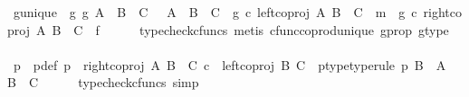\begin{isabellebody}
\ g{\isacharunderscore}{\kern0pt}unique{\isacharcolon}{\kern0pt}\ {\isachardoublequoteopen}{\isasymexists}{\isacharbang}{\kern0pt}\ g{\isachardot}{\kern0pt}\ {\isacharparenleft}{\kern0pt}{\isacharparenleft}{\kern0pt}g{\isacharcolon}{\kern0pt}\ A\ {\isasymCoprod}\ {\isacharparenleft}{\kern0pt}B\ {\isasymCoprod}\ C{\isacharparenright}{\kern0pt}\ \ {\isasymrightarrow}\ {\isacharparenleft}{\kern0pt}A\ {\isasymCoprod}\ B{\isacharparenright}{\kern0pt}\ {\isasymCoprod}\ C{\isacharparenright}{\kern0pt}\ {\isasymand}\ {\isacharparenleft}{\kern0pt}g\ {\isasymcirc}\isactrlsub c\ {\isacharparenleft}{\kern0pt}left{\isacharunderscore}{\kern0pt}coproj\ A\ {\isacharparenleft}{\kern0pt}B\ {\isasymCoprod}\ C{\isacharparenright}{\kern0pt}{\isacharparenright}{\kern0pt}\ {\isacharequal}{\kern0pt}\ m{\isacharparenright}{\kern0pt}\ {\isasymand}\ {\isacharparenleft}{\kern0pt}g\ {\isasymcirc}\isactrlsub c\ {\isacharparenleft}{\kern0pt}right{\isacharunderscore}{\kern0pt}coproj\ A\ {\isacharparenleft}{\kern0pt}B\ {\isasymCoprod}\ C{\isacharparenright}{\kern0pt}{\isacharparenright}{\kern0pt}\ {\isacharequal}{\kern0pt}\ f{\isacharparenright}{\kern0pt}{\isacharparenright}{\kern0pt}{\isachardoublequoteclose}\isanewline
\ \ \ \ \isamarkupfalse%
\ {\isacharparenleft}{\kern0pt}typecheck{\isacharunderscore}{\kern0pt}cfuncs{\isacharcomma}{\kern0pt}\ metis\ cfunc{\isacharunderscore}{\kern0pt}coprod{\isacharunderscore}{\kern0pt}unique\ g{\isacharunderscore}{\kern0pt}prop\ g{\isacharunderscore}{\kern0pt}type{\isacharparenright}{\kern0pt}\isanewline
\isanewline
\ \ \isamarkupfalse%
\ p\ \ p{\isacharunderscore}{\kern0pt}def{\isacharcolon}{\kern0pt}\ {\isachardoublequoteopen}p\ {\isacharequal}{\kern0pt}\ {\isacharparenleft}{\kern0pt}right{\isacharunderscore}{\kern0pt}coproj\ A\ {\isacharparenleft}{\kern0pt}B\ {\isasymCoprod}\ C{\isacharparenright}{\kern0pt}{\isacharparenright}{\kern0pt}\ {\isasymcirc}\isactrlsub c\ \ {\isacharparenleft}{\kern0pt}left{\isacharunderscore}{\kern0pt}coproj\ B\ C{\isacharparenright}{\kern0pt}{\isachardoublequoteclose}\ \ p{\isacharunderscore}{\kern0pt}type{\isacharbrackleft}{\kern0pt}type{\isacharunderscore}{\kern0pt}rule{\isacharbrackright}{\kern0pt}{\isacharcolon}{\kern0pt}\ {\isachardoublequoteopen}p{\isacharcolon}{\kern0pt}\ B\ {\isasymrightarrow}\ A\ {\isasymCoprod}\ {\isacharparenleft}{\kern0pt}B\ {\isasymCoprod}\ C{\isacharparenright}{\kern0pt}{\isachardoublequoteclose}\isanewline
\ \ \ \ \isamarkupfalse%
\ {\isacharparenleft}{\kern0pt}typecheck{\isacharunderscore}{\kern0pt}cfuncs{\isacharcomma}{\kern0pt}\ simp{\isacharparenright}{\kern0pt}\isanewline

\end{isabellebody}
